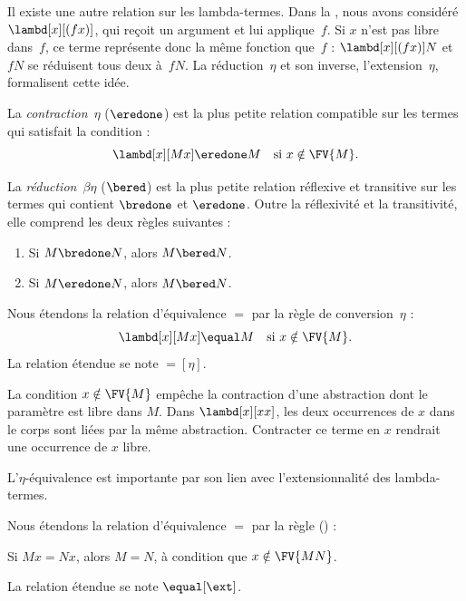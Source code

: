 \documentclass[../../../include/open-logic-section]{subfiles}
\begin{document}

Il existe une autre relation sur les
lambda-termes. Dans la , nous
avons considéré $\lambd[x][(fx)]$, qui
reçoit un argument et lui applique~$f$.
Si $x$ n'est pas libre dans~$f$, ce terme
représente donc la même fonction que~$f$ :
$\lambd[x][(fx)]N$ et $fN$ se réduisent
tous deux à~$fN$. La réduction~$\eta$
et son inverse, l'extension~$\eta$,
formalisent cette idée.

\begin{defn}
La \emph{contraction~$\eta$} ($\eredone$)
est la plus petite relation compatible sur
les termes qui satisfait la condition :
\[
  \lambd[x][M x] \eredone M
  \quad\text{si }x \notin \FV{M}.
\]
\end{defn}

\begin{defn}
La \emph{réduction~$\beta\eta$} ($\bered$)
est la plus petite relation réflexive et
transitive sur les termes qui contient
$\bredone$ et $\eredone$. Outre la
réflexivité et la transitivité, elle
comprend les deux règles suivantes :
\begin{enumerate}
\item Si $M \bredone N$, alors $M \bered N$.
\item Si $M \eredone N$, alors $M \bered N$.
\end{enumerate}
\end{defn}

\begin{defn}
Nous étendons la relation d'équivalence
$\equal$ par la règle de conversion~$\eta$ :
\[
  \lambd[x][M x] \equal M
  \quad\text{si }x \notin \FV{M}.
\]
La relation étendue se note $\equal[\eta]$.
\end{defn}

La condition $x\notin\FV{M}$ empêche la contraction
d'une abstraction dont le paramètre est libre dans $M$.
Dans $\lambd[x][x x]$, les deux occurrences de $x$
dans le corps sont liées par la même abstraction.
Contracter ce terme en $x$ rendrait une occurrence
de $x$ libre.

L'$\eta$-équivalence est importante par son
lien avec l'extensionnalité des lambda-termes.

\begin{defn}[Extensionnalité]
Nous étendons la relation d'équivalence
$\equal$ par la règle (\ext) :
\begin{center}
Si $Mx \equal Nx$, alors $M \equal N$,
à condition que $x \notin \FV{MN}$.
\end{center}
La relation étendue se note $\equal[\ext]$.
\end{defn}
\end{document}
